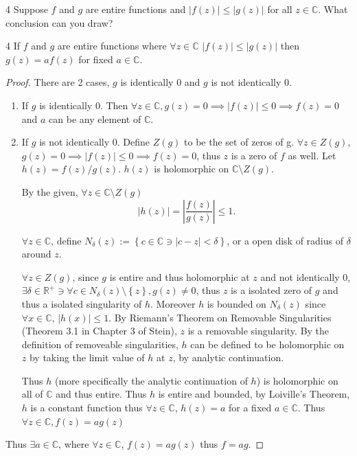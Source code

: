 \documentclass{article}
\newcommand{\C}{\mathbb{C}}
\newcommand{\R}{\mathbb{R}}
\newcommand{\abs}[1]{\left\lvert #1\right\rvert}
\begin{document}
\begin{PROB}{4}\label{Problem 4.}
    Suppose $f$ and $g$ are entire functions and $\abs{f(z)} \leq \abs{g(z)}$ for all $z \in \C$. What conclusion can you draw?    
\end{PROB}
\begin{claim}{4}\label{Claim 4.}
    If $f$ and $g$ are entire functions where $\forall z \in \C$ $\abs{f(z)} \leq \abs{g(z)}$ then $g(z) = af(z)$ for fixed $a \in \C$.       
\end{claim}
\begin{proof}
    There are 2 cases, $g$ is identically 0 and $g$ is not identically 0. 
    
    \begin{enumerate}
        \item If $g$ is identically 0. Then $\forall z \in \C, g(z) = 0 \implies \abs{f(z)} \leq 0 \implies f(z) = 0$ and $a$ can be any element of $\C$.
        \item If $g$ is not identically 0. Define $Z(g)$ to be the set of zeros of g. $\forall z \in Z(g)$, $g(z) = 0 \implies \abs{f(z)} \leq 0 \implies f(z) = 0$, thus $z$ is a zero of $f$ as well. Let $h(z) = f(z) / g(z)$. $h(z)$ is holomorphic on $\C \setminus Z(g)$. 
        
        
        By the given, $\forall z \in \C \setminus Z(g)$ 
        \begin{equation*}
            \abs{h(z)} = \abs{\frac{f(z)}{g(z)}} \leq 1.
        \end{equation*}

        $\forall z \in \C$, define $N_\delta(z) := \left\{ c \in \C \ni \abs{c -z} < \delta \right\}$, or a open disk of radius of $\delta$ around $z$. 

        $\forall z \in Z(g)$, since $g$ is entire and thus holomorphic at $z$ and not identically 0, $\exists \delta \in \R^+ \ni \forall c \in N_\delta(z) \setminus \left\{ z \right\}, g(z) \neq 0$, thus $z$ is a isolated zero of $g$ and thus a isolated singularity of $h$. Moreover $h$ is bounded on $N_\delta(z)$ since $\forall x \in \C$, $\abs{h(x)} \leq 1$. By Riemann's Theorem on Removable Singularities (Theorem 3.1 in Chapter 3 of Stein), $z$ is a removable singularity. By the definition of removeable singularities, $h$ can be defined to be holomorphic on $z$ by taking the limit value of $h$ at $z$, by analytic continuation.
        
        Thus $h$ (more specifically the analytic continuation of $h$) is holomorphic on all of $\C$ and thus entire. Thus $h$ is entire and bounded, by Loiville's Theorem, $h$ is a constant function thus $\forall z \in \C$, $h(z) = a$ for a fixed $a \in \C$. Thus $\forall z \in \C, f(z) = a g(z)$ 
    \end{enumerate}
    
    Thus $\exists a \in \C$, where $\forall z \in \C$, $f(z) = a g(z)$ thus $f = ag$.    
\end{proof}
\end{document}
